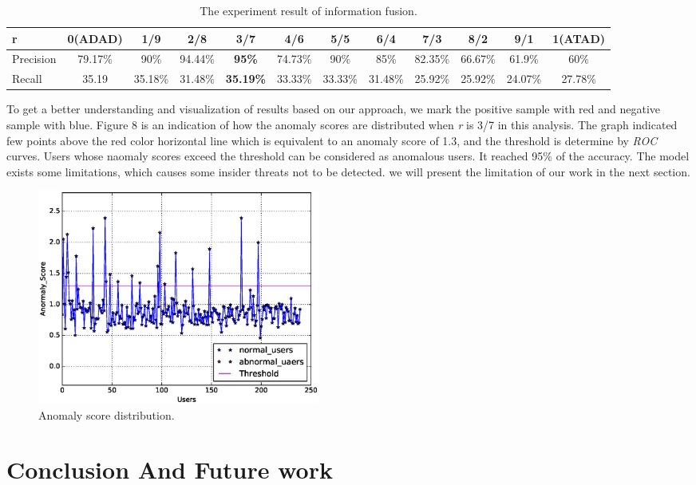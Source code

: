 \documentclass[conference]{IEEEtran}
\begin{document}
\begin{table}[tbp]
\caption{The experiment result of information fusion.}
\centering  %
\begin{tabular}{lccccccccccc}  %
\hline
r &0(ADAD)&1/9 &2/8 &3/7 &4/6 &5/5 &6/4 &7/3 &8/2 &9/1 &1(ATAD)\\\hline

Precision &79.17\% &90\% &94.44\% &\textbf{95\%}&74.73\%&90\%  &85\% &82.35\% &66.67\%&61.9\%&60\% \\\hline

Recall &35.19 &35.18\% &31.48\% &\textbf{35.19\%}&33.33\%&33.33\%&31.48\%&25.92\%&25.92\%&24.07\%&27.78\%\\\hline
\end{tabular}

\end{table}

To get a better understanding and visualization of results based on our approach, we mark the positive sample with red and negative sample with blue. Figure 8 is an indication of how the anomaly scores are distributed when \emph{r} is 3/7 in this analysis. The graph indicated few points above the red color horizontal line which is equivalent to an anomaly score of 1.3, and the threshold is determine by \emph{ROC} curves. Users whose naomaly scores exceed the threshold can be considered as anomalous users. It reached 95\% of the accuracy. The model exists some limitations, which causes some insider threats not to be detected. 
we will present the limitation of our work in the next section.

\begin{figure}[htb]
\centerline{\includegraphics[width = 0.45\textwidth]{figure/figure8.eps}}
\caption{Anomaly score distribution.}
\label{fig}
\end{figure}

\section{Conclusion And Future work}
\end{document}
